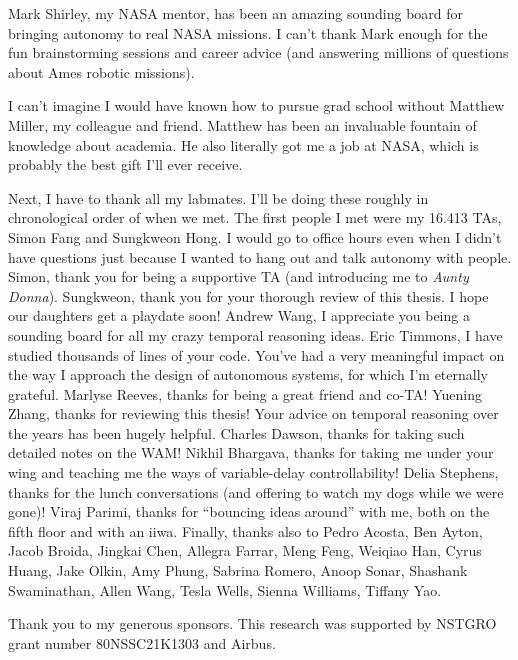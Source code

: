 \documentclass[12pt,vi,leftblank,twoside]{mitthesis}
\begin{document}
Mark Shirley, my NASA mentor, has been an amazing sounding board for bringing autonomy to real NASA
missions. I can't thank Mark enough for the fun brainstorming sessions and career advice (and
answering millions of questions about Ames robotic missions).

I can't imagine I would have known how to pursue grad school without Matthew Miller, my colleague
and friend. Matthew has been an invaluable fountain of knowledge about academia. He also literally
got me a job at NASA, which is probably the best gift I'll ever receive.

Next, I have to thank all my labmates. I'll be doing these roughly in chronological order of when we
met. The first people I met were my 16.413 TAs, Simon Fang and Sungkweon Hong. I would go to office
hours even when I didn't have questions just because I wanted to hang out and talk autonomy with
people. Simon, thank you for being a supportive TA (and introducing me to \emph{Aunty Donna}). Sungkweon,
thank you for your thorough review of this thesis. I hope our daughters get a playdate soon! Andrew
Wang, I appreciate you being a sounding board for all my crazy temporal reasoning ideas. Eric
Timmons, I have studied thousands of lines of your code. You've had a very meaningful impact on the
way I approach the design of autonomous systems, for which I'm eternally grateful. Marlyse Reeves,
thanks for being a great friend and co-TA! Yuening Zhang, thanks for reviewing this thesis! Your
advice on temporal reasoning over the years has been hugely helpful. Charles Dawson, thanks for
taking such detailed notes on the WAM! Nikhil Bhargava, thanks for taking me under your wing and
teaching me the ways of variable-delay controllability! Delia Stephens, thanks for the lunch
conversations (and offering to watch my dogs while we were gone)! Viraj Parimi, thanks for ``bouncing
ideas around'' with me, both on the fifth floor and with an iiwa. Finally, thanks also to Pedro
Acosta, Ben Ayton, Jacob Broida, Jingkai Chen, Allegra Farrar, Meng Feng, Weiqiao Han, Cyrus Huang,
Jake Olkin, Amy Phung, Sabrina Romero, Anoop Sonar, Shashank Swaminathan, Allen Wang, Tesla Wells,
Sienna Williams, Tiffany Yao.

Thank you to my generous sponsors. This research was supported by NSTGRO grant number 80NSSC21K1303
and Airbus.

\pagestyle{plain}

\tableofcontents
\newpage
\listoffigures
\newpage
\renewcommand\listoflistingscaption{List of source codes}
\listoflistings
\newpage
\listoftables
\end{document}
